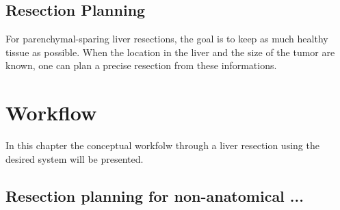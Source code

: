 \subsection{Resection Planning}
For parenchymal-sparing liver resections, the goal is to keep as much healthy tissue as
possible. When the location in the liver and the size of the tumor are known, one can plan a
precise resection from these informations.

\section{Workflow}
In this chapter the conceptual workfolw through a liver resection using the
desired system will be presented.
\subsection{Resection planning for non-anatomical ...}

